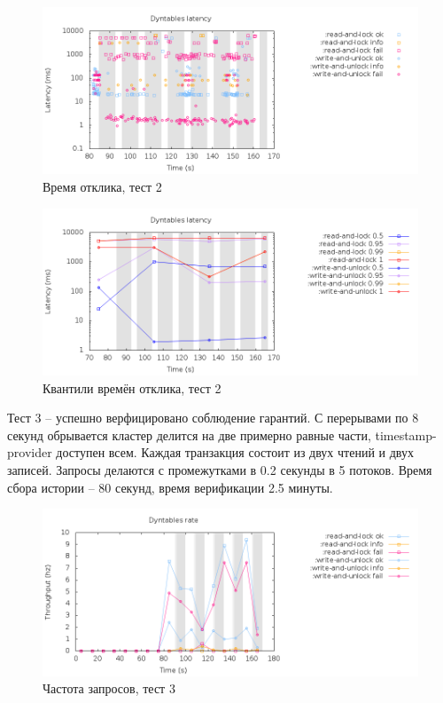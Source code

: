\documentclass[pdftex,ptm,14pt,a4paper]{extreport}
\theoremstyle{definition}
\begin{document}
\begin{figure}[h]
    \includegraphics[scale=0.6]{dyntables-2/latency-raw.png}
    \caption{Время отклика, тест 2}
\end{figure}

\begin{figure}[h]
    \includegraphics[scale=0.6]{dyntables-2/latency-quantiles.png}
    \caption{Квантили времён отклика, тест 2}
\end{figure}

Тест 3 -- успешно верфицировано соблюдение гарантий. С перерывами по 8 секунд
обрывается кластер делится на две примерно равные части, timestamp-provider доступен всем. Каждая транзакция состоит
из двух чтений и двух записей. Запросы делаются с промежутками в 0.2 секунды в 5 потоков.
Время сбора истории -- 80 секунд, время верификации 2.5 минуты.

\begin{figure}[h]
    \includegraphics[scale=0.6]{dyntables-3/rate.png}
    \caption{Частота запросов, тест 3}
\end{figure}
\end{document}
